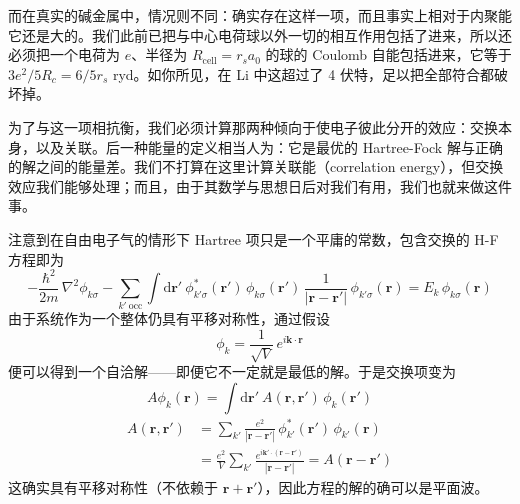 而在真实的碱金属中，情况则不同：确实存在这样一项，而且事实上相对于内聚能它还是大的。我们此前已把与中心电荷球以外一切的相互作用包括了进来，所以还必须把一个电荷为 $e$、半径为 $R_{\mathrm{cell}} = r_s a_0$ 的球的 Coulomb 自能包括进来，它等于 $3e^2/5R_c = 6/5r_s$ ryd。如你所见，在 Li 中这超过了 4 伏特，足以把全部符合都破坏掉。

为了与这一项相抗衡，我们必须计算那两种倾向于使电子彼此分开的效应：交换本身，以及关联。后一种能量的定义相当人为：它是最优的 Hartree-Fock 解与正确的解之间的能量差。我们不打算在这里计算关联能（correlation energy），但交换效应我们能够处理；而且，由于其数学与思想日后对我们有用，我们也就来做这件事。

注意到在自由电子气的情形下 Hartree 项只是一个平庸的常数，包含交换的 H-F 方程即为
\begin{equation*}
-\frac{\hbar^2}{2m}\,\nabla^2\phi_{k\sigma} - \sum_{k'\ \mathrm{occ}} \int \mathrm{d}\mathbf{r}'\ \phi^*_{k'\sigma}(\mathbf{r}')\,\phi_{k\sigma}(\mathbf{r}')\,\frac{1}{|\mathbf{r}-\mathbf{r}'|}\,\phi_{k'\sigma}(\mathbf{r}) = E_k\,\phi_{k\sigma}(\mathbf{r})
\end{equation*}
由于系统作为一个整体仍具有平移对称性，通过假设
\begin{equation*}
\phi_k = \frac{1}{\sqrt{V}}\,e^{i\mathbf{k}\cdot\mathbf{r}}
\end{equation*}
便可以得到一个自洽解——即便它不一定就是最低的解。于是交换项变为
\begin{equation*}
A\phi_k(\mathbf{r}) = \int \mathrm{d}\mathbf{r}'\ A(\mathbf{r},\mathbf{r}')\,\phi_k(\mathbf{r}')
\end{equation*}
\begin{align*}
A(\mathbf{r},\mathbf{r}') &= \sum_{k'}\frac{e^2}{|\mathbf{r}-\mathbf{r}'|}\,\phi^*_{k'}(\mathbf{r}')\,\phi_{k'}(\mathbf{r})\\
&= \frac{e^2}{V}\sum_{k'}\frac{e^{i\mathbf{k}'\cdot(\mathbf{r}-\mathbf{r}')}}{|\mathbf{r}-\mathbf{r}'|} = A(\mathbf{r}-\mathbf{r}')
\end{align*}
这确实具有平移对称性（不依赖于 $\mathbf{r}+\mathbf{r}'$），因此方程的解的确可以是平面波。


